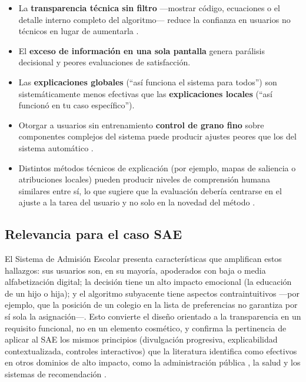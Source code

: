 \begin{itemize}
    \item La \textbf{transparencia técnica sin filtro} —mostrar código, ecuaciones o el detalle interno completo del algoritmo— reduce la confianza en usuarios no técnicos en lugar de aumentarla \citep{springerwhittaker2019}.
    \item El \textbf{exceso de información en una sola pantalla} genera parálisis decisional y peores evaluaciones de satisfacción.
    \item Las \textbf{explicaciones globales} (``así funciona el sistema para todos'') son sistemáticamente menos efectivas que las \textbf{explicaciones locales} (``así funcionó en tu caso específico'').
    \item Otorgar a usuarios sin entrenamiento \textbf{control de grano fino} sobre componentes complejos del sistema puede producir ajustes peores que los del sistema automático \citep{feddersen2024forecasting}.
    \item Distintos métodos técnicos de explicación (por ejemplo, mapas de saliencia o atribuciones locales) pueden producir niveles de comprensión humana similares entre sí, lo que sugiere que la evaluación debería centrarse en el ajuste a la tarea del usuario y no solo en la novedad del método \citep{dawoud2023comparative}.
\end{itemize}

\subsection{Relevancia para el caso SAE}

El Sistema de Admisión Escolar presenta características que amplifican estos hallazgos: sus usuarios son, en su mayoría, apoderados con baja o media alfabetización digital; la decisión tiene un alto impacto emocional (la educación de un hijo o hija); y el algoritmo subyacente tiene aspectos contraintuitivos —por ejemplo, que la posición de un colegio en la lista de preferencias no garantiza por sí sola la asignación—. Esto convierte el diseño orientado a la transparencia en un requisito funcional, no en un elemento cosmético, y confirma la pertinencia de aplicar al SAE los mismos principios (divulgación progresiva, explicabilidad contextualizada, controles interactivos) que la literatura identifica como efectivos en otros dominios de alto impacto, como la administración pública \citep{nefedov2022}, la salud \citep{rivas2024transparency} y los sistemas de recomendación \citep{masciari2024systematic}.

